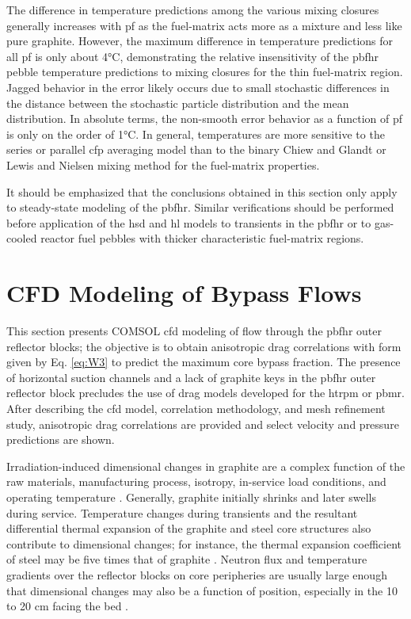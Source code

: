 The difference in temperature predictions among the various mixing closures generally increases with \gls{pf} as the fuel-matrix acts more as a mixture and less like pure graphite. However, the maximum difference in temperature predictions for all \gls{pf} is only about 4\si{\celsius}, demonstrating the relative insensitivity of the \gls{pbfhr} pebble temperature predictions to mixing closures for the thin fuel-matrix region. Jagged behavior in the error likely occurs due to small stochastic differences in the distance between the stochastic particle distribution and the mean distribution. In absolute terms, the non-smooth error behavior as a function of \gls{pf} is only on the order of 1\si{\celsius}. In general, temperatures are more sensitive to the series or parallel \gls{cfp} averaging model than to the binary Chiew and Glandt or Lewis and Nielsen mixing method for the fuel-matrix properties. 

It should be emphasized that the conclusions obtained in this section only apply to steady-state modeling of the \gls{pbfhr}. Similar verifications should be performed before application of the \gls{hsd} and \gls{hl} models to transients in the \gls{pbfhr} or to gas-cooled reactor fuel pebbles with thicker characteristic fuel-matrix regions.

\section[Computational Fluid Dynamics Modeling of Bypass Flows]{CFD Modeling of Bypass Flows}
\label{sec:bypass}

This section presents COMSOL \gls{cfd} modeling of flow through the \gls{pbfhr} outer reflector blocks; the objective is to obtain anisotropic drag correlations with form given by Eq. \eqref{eq:W3} to predict the maximum core bypass fraction. The presence of horizontal suction channels and a lack of graphite keys in the \gls{pbfhr} outer reflector block precludes the use of drag models developed for the \gls{htrpm} or \gls{pbmr}. After describing the \gls{cfd} model, correlation methodology, and mesh refinement study, anisotropic drag correlations are provided and select velocity and pressure predictions are shown.

Irradiation-induced dimensional changes in graphite are a complex function of the raw materials, manufacturing process, isotropy, in-service load conditions, and operating temperature \cite{marsden}. Generally, graphite initially shrinks and later swells during service. Temperature changes during transients and the resultant differential thermal expansion of the graphite and steel core structures also contribute to dimensional changes; for instance, the thermal expansion coefficient of steel may be five times that of graphite \cite{marsden}. Neutron flux and temperature gradients over the reflector blocks on core peripheries are usually large enough that dimensional changes may also be a function of position, especially in the 10 to 20 \si{\centi\meter} facing the bed \cite{oehme}.

